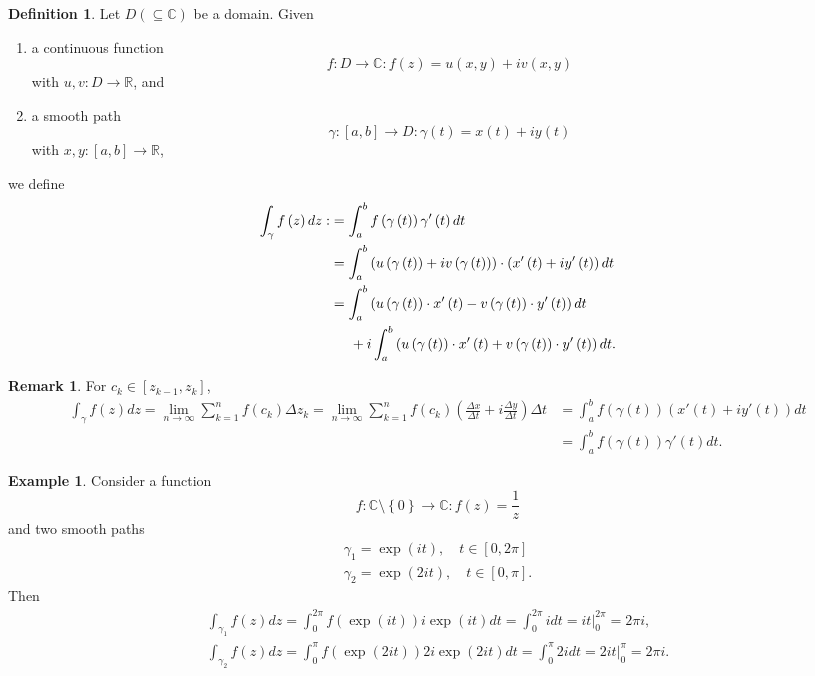 \documentclass[12pt,openany]{book}
\theoremstyle{definition}
\newtheorem{definition}{Definition}[chapter]
\newtheorem{remark}{Remark}[section]
\newtheorem{example}{Example}[section]
\newcommand{\set}[1]{\left\{#1\right\}}
\newcommand{\R}{\mathbb{R}}
\newcommand{\C}{\mathbb{C}}
\newcommand{\of}[1]{\left( #1 \right)}
\begin{document}
	
	\begin{tcolorbox}[colback=white,colframe=defcolor,arc=5pt,title={\color{white}\bf Contour Integral}]
		\begin{definition}
			Let $D\of{\subseteq\C}$ be a domain. Given \begin{enumerate}
				\item a continuous function \[
				f:D\to\C:f\of{z}=u(x,y)+iv(x,y)
				\] with $u,v:D\to\R$, and
				\item a smooth path $$\gamma:[a,b]\to D:\gamma\of{t}=x\of{t}+iy\of{t}$$
				with $x,y:[a,b]\to\R$,
			\end{enumerate} 
			we define \begin{align*}
				\int_\gamma f\of{z}dz:&=\int_a^bf\of{\gamma\of{t}}\gamma'\of{t}dt\\
				&=\int_a^b\of{u\of{\gamma\of{t}}+iv\of{\gamma\of{t}}}\cdot\of{x'\of{t}+iy'\of{t}}dt\\
				&=\int_a^b\of{u\of{\gamma\of{t}}\cdot x'\of{t}-v\of{\gamma\of{t}}\cdot y'\of{t}}dt\\
				&\hspace{5mm} +i\int_a^b\of{u\of{\gamma\of{t}}\cdot x'\of{t}+v\of{\gamma\of{t}}\cdot y'\of{t}}dt.
			\end{align*}
		\end{definition}
	\end{tcolorbox}
	\begin{remark}
		For $c_k\in\left[z_{k-1},z_k\right]$,\begin{align*}
			\int_\gamma f\of{z}dz=\lim_{n\to\infty}\sum_{k=1}^nf\of{c_k}\Delta z_k=\lim_{n\to\infty}\sum_{k=1}^nf\of{c_k}\of{\frac{\Delta x}{\Delta t}+i\frac{\Delta y}{\Delta t}}\Delta t
			&=\int_a^bf\of{\gamma\of{t}}\of{x'\of{t}+iy'\of{t}}dt\\
			&=\int_a^bf\of{\gamma\of{t}}\gamma'\of{t}dt.
		\end{align*}
	\end{remark}
	\begin{example}
		Consider a function \[
		f:\C\setminus\set{0}\to\C:f\of{z}=\frac{1}{z}
		\] and two smooth paths
		\begin{align*}
			\gamma_1=\exp\of{it},\quad t\in\left[0,2\pi\right]\\
			\gamma_2=\exp\of{2it},\quad t\in\left[0,\pi\right].
		\end{align*} Then \begin{align*}
			\int_{\gamma_1}f\of{z}dz=\int_{0}^{2\pi}f\of{\exp\of{it}}i\exp\of{it}dt=\int_0^{2\pi}idt=it\bigg|_{0}^{2\pi}=2\pi i,\\
			\int_{\gamma_2}f\of{z}dz=\int_{0}^{\pi}f\of{\exp\of{2it}}2i\exp\of{2it}dt=\int_0^{\pi}2idt=2it\bigg|_{0}^{\pi}=2\pi i.
		\end{align*}
	\end{example}
	
\end{document}
